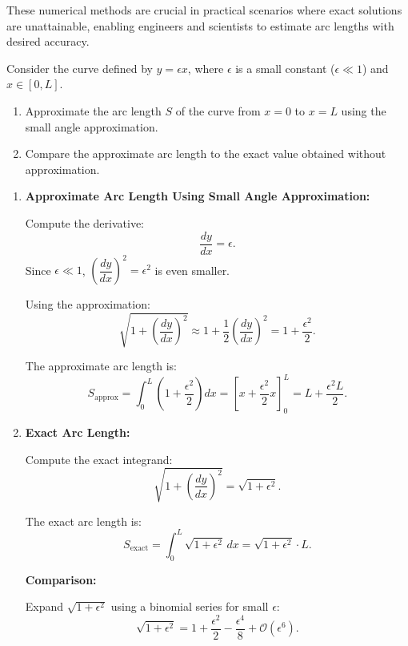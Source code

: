 \noindent These numerical methods are crucial in practical scenarios where exact solutions are unattainable, enabling engineers and scientists to estimate arc lengths with desired accuracy.

\exampleline
\begin{example}
Consider the curve defined by \( y = \epsilon x \), where \( \epsilon \) is a small constant (\( \epsilon \ll 1 \)) and \( x \in [0, L] \).

\begin{enumerate}
    \item Approximate the arc length \( S \) of the curve from \( x = 0 \) to \( x = L \) using the small angle approximation.
    \item Compare the approximate arc length to the exact value obtained without approximation.
\end{enumerate}

\begin{solution}
\begin{enumerate}
    \item \textbf{Approximate Arc Length Using Small Angle Approximation:}
    
    Compute the derivative:
    \[
    \dfrac{dy}{dx} = \epsilon.
    \]
    Since \( \epsilon \ll 1 \), \( \left( \dfrac{dy}{dx} \right)^2 = \epsilon^2 \) is even smaller.
    
    Using the approximation:
    \[
    \sqrt{1 + \left( \dfrac{dy}{dx} \right)^2 } \approx 1 + \dfrac{1}{2} \left( \dfrac{dy}{dx} \right)^2 = 1 + \dfrac{\epsilon^2}{2}.
    \]
    
    The approximate arc length is:
    \[
    S_{\text{approx}} = \int_{0}^{L} \left( 1 + \dfrac{\epsilon^2}{2} \right) dx = \left[ x + \dfrac{\epsilon^2}{2} x \right]_0^{L} = L + \dfrac{\epsilon^2 L}{2}.
    \]
    
    \item \textbf{Exact Arc Length:}
    
    Compute the exact integrand:
    \[
    \sqrt{1 + \left( \dfrac{dy}{dx} \right)^2 } = \sqrt{1 + \epsilon^2}.
    \]
    
    The exact arc length is:
    \[
    S_{\text{exact}} = \int_{0}^{L} \sqrt{1 + \epsilon^2} \, dx = \sqrt{1 + \epsilon^2} \cdot L.
    \]
    
    \textbf{Comparison:}
    
    Expand \( \sqrt{1 + \epsilon^2} \) using a binomial series for small \( \epsilon \):
    \[
    \sqrt{1 + \epsilon^2} = 1 + \dfrac{\epsilon^2}{2} - \dfrac{\epsilon^4}{8} + \mathcal{O}(\epsilon^6).
    \]
    

\end{enumerate}
\end{solution}
\end{example}
